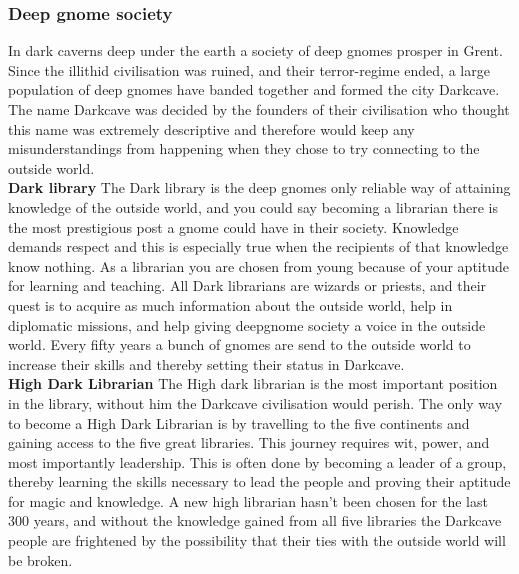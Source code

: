 \documentclass[a4paper]{article}
\begin{document}
\subsubsection{Deep gnome society}
In dark caverns deep under the earth a society of deep gnomes prosper in Grent. Since the illithid civilisation was ruined, and their terror-regime ended, a large population of deep gnomes have banded together and formed the city Darkcave. The name Darkcave was decided by the founders of their civilisation who thought this name was extremely descriptive and therefore would keep any misunderstandings from happening when they chose to try connecting to the outside world.
\\
\textbf{Dark library}
The Dark library is the deep gnomes only reliable way of attaining knowledge of the outside world, and you could say becoming a librarian there is the most prestigious post a gnome could have in their society. Knowledge demands respect and this is especially true when the recipients of that knowledge know nothing. As a librarian you are chosen from young because of your aptitude for learning and teaching. All Dark librarians are wizards or priests, and their quest is to acquire as much information about the outside world, help in diplomatic missions, and help giving deepgnome society a voice in the outside world. Every fifty years a bunch of gnomes are send to the outside world to increase their skills and thereby setting their status in Darkcave.
\\
\textbf{High Dark Librarian} 
The High dark librarian is the most important position in the library, without him the Darkcave civilisation would perish. The only way to become a High Dark Librarian is by travelling to the five continents and gaining access to the five great libraries. This journey requires wit, power, and most importantly leadership. This is often done by becoming a leader of a group, thereby learning the skills necessary to lead the people and proving their aptitude for magic and knowledge. A new high librarian hasn't been chosen for the last 300 years, and without the knowledge gained from all five libraries the Darkcave people are frightened by the possibility that their ties with the outside world will be broken.
\\
\end{document}
